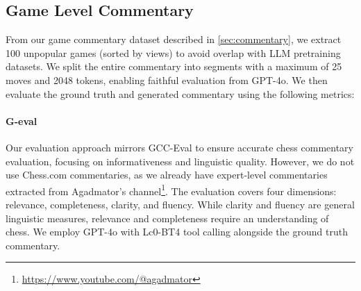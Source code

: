 \documentclass{article}
\newcommand{\yaman}[1]{\textcolor{yamanColor}{\scriptsize \textit{#1}}}
\newcommand{\yaman}[1]{{\scriptsize\textcolor{red}{[Yaman: #1]}}}
\theoremstyle{plain}
\theoremstyle{definition}
\theoremstyle{remark}
\begin{document}
\begin{table}[!h]
    \label{tab:gameplay-performance}
\end{table}

\subsection{Game Level Commentary}
From our game commentary dataset described in \cref{sec:commentary}, we extract 100 unpopular games (sorted by views) to avoid overlap with LLM pretraining datasets. We split the entire commentary into segments with a maximum of 25 moves and 2048 tokens, enabling faithful evaluation from GPT-4o. We then evaluate the ground truth and generated commentary using the following metrics:

\paragraph{G-eval}
Our evaluation approach mirrors GCC-Eval \cite{kim2024bridging} to ensure accurate chess commentary evaluation, focusing on informativeness and linguistic quality. However, we do not use Chess.com commentaries, as we already have expert-level commentaries extracted from Agadmator's channel\footnote{\url{https://www.youtube.com/@agadmator}}. The evaluation covers four dimensions: relevance, completeness, clarity, and fluency. While clarity and fluency are general linguistic measures, relevance and completeness require an understanding of chess. We employ GPT-4o with Lc0-BT4 tool calling alongside the ground truth commentary.
\end{document}
